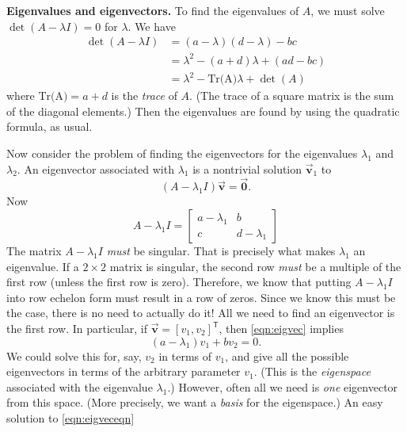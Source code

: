 \documentclass[reqno]{immbook}
\newcommand{\BV}{\vec{\textbf{v}}}
\newcommand{\BZero}{\vec{\textbf{0}}}  %
\numberwithin{equation}{chapter}
\numberwithin{question}{section}
\numberwithin{theorem}{chapter}
\numberwithin{figure}{chapter}
\theoremstyle{definition}
\begin{document}
\noindent
\textbf{Eigenvalues and eigenvectors.}
To find the eigenvalues of $A$, we must solve
$\det(A-\lambda I)=0$ for $\lambda$.
We have
\[
\begin{split}
   \det(A-\lambda I) & = (a-\lambda)(d-\lambda)-bc \\
                     & = \lambda^2-(a+d)\lambda + (ad-bc) \\
		     & = \lambda^2 - \textrm{Tr(A)}\lambda + \det(A)
\end{split}
\]
where $\textrm{Tr(A)} = a+d$ is the \emph{trace} of $A$.
(The trace of a square matrix is the sum of the diagonal elements.)
Then the eigenvalues are found by using the quadratic
formula, as usual.

Now consider the problem of finding the eigenvectors
for the eigenvalues $\lambda_1$ and $\lambda_2$.
An eigenvector associated with $\lambda_1$ is a nontrivial
solution $\BV_1$ to
\begin{equation}
    (A-\lambda_1 I)\BV = \BZero.
\label{eqn:eigvec}
\end{equation}
Now
\[
   A - \lambda_1 I = \begin{bmatrix}
                           a-\lambda_1 & b \\
			   c & d-\lambda_1
                     \end{bmatrix}
\]
The matrix $A-\lambda_1 I$ \emph{must} be singular.
That is precisely what makes $\lambda_1$ an eigenvalue.
If a $2\times 2$ matrix is singular, the second
row \emph{must} be a multiple of the first row (unless
the first row is zero).  Therefore, we know that putting
$A-\lambda_1 I$ into row echelon form must result in
a row of zeros.  Since we know this must be the case,
there is no need to actually do it!  All we need to
find an eigenvector is the first row.
In particular, if $\BV = [v_1,v_2]^{\textsf{T}}$,
then \eqref{eqn:eigvec} implies
\begin{equation}
  (a-\lambda_1)v_1 + b v_2 = 0.
\label{eqn:eigveceqn}
\end{equation}
We could solve this for, say, $v_2$ in terms of $v_1$,
and give all the possible eigenvectors in terms of
the arbitrary parameter $v_1$. (This is the
\emph{eigenspace} associated with the eigenvalue $\lambda_1$.)
However,
often
all we need is \emph{one} eigenvector from this space.
(More precisely, we want a \emph{basis} for the eigenspace.)
An easy solution to \eqref{eqn:eigveceqn}
\end{document}
